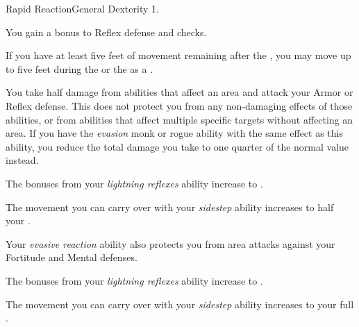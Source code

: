     \begin{feat}{Rapid Reaction}{General}
        \featpre Dexterity 1.

         You gain a  bonus to Reflex defense and  checks.

         If you have at least five feet of movement remaining after the , you may move up to five feet during the  or the  as a .

         You take half damage from abilities that affect an area and attack your Armor or Reflex defense.
        This does not protect you from any non-damaging effects of those abilities, or from abilities that affect multiple specific targets without affecting an area.
        If you have the \textit{evasion} monk or rogue ability with the same effect as this ability, you reduce the total damage you take to one quarter of the normal value instead.

         The bonuses from your \textit{lightning reflexes} ability increase to .

         The movement you can carry over with your \textit{sidestep} ability increases to half your .

         Your \textit{evasive reaction} ability also protects you from area attacks against your Fortitude and Mental defenses.

         The bonuses from your \textit{lightning reflexes} ability increase to .

         The movement you can carry over with your \textit{sidestep} ability increases to your full .
    \end{feat}

